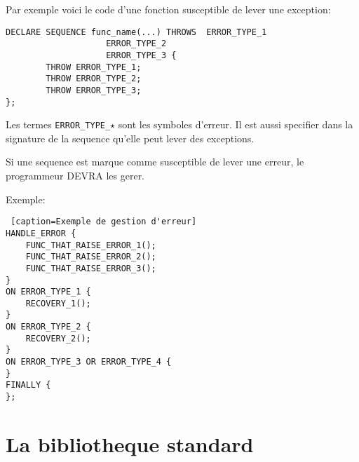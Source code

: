 \documentclass{rtxreport}
\begin{document}
Par exemple voici le code d'une fonction susceptible de lever une exception:
\begin{lstlisting}[caption=Exemple d'une fonction levant une exception]
DECLARE SEQUENCE func_name(...) THROWS	ERROR_TYPE_1
					ERROR_TYPE_2
					ERROR_TYPE_3 {
		THROW ERROR_TYPE_1;
		THROW ERROR_TYPE_2;
		THROW ERROR_TYPE_3;
};
\end{lstlisting}

Les termes \texttt{ERROR\_TYPE\_$\star$} sont les symboles d'erreur.
Il est aussi specifier dans la signature de la sequence qu'elle peut lever
des exceptions.

Si une sequence est marque comme susceptible de lever une erreur,
le programmeur DEVRA les gerer.

Exemple:

\begin{lstlisting} [caption=Exemple de gestion d'erreur]
HANDLE_ERROR {
	FUNC_THAT_RAISE_ERROR_1();
	FUNC_THAT_RAISE_ERROR_2();
	FUNC_THAT_RAISE_ERROR_3();
}
ON ERROR_TYPE_1 {
	RECOVERY_1();
}
ON ERROR_TYPE_2 {
	RECOVERY_2();
}
ON ERROR_TYPE_3 OR ERROR_TYPE_4 {
}
FINALLY {
};
\end{lstlisting}

\chapter{La bibliotheque standard}
\end{document}
